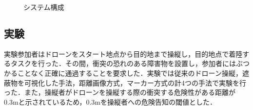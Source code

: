 \documentclass[a4j,10pt,twocolumn]{jarticle}
\begin{document}
\begin{figure}[tb]
\begin{center}
  \vspace{-2mm}
  \caption{システム構成}
  \label{fig:principle}
\end{center}
\end{figure}

\subsection{実験}
実験参加者はドローンをスタート地点から目的地まで操縦し，目的地点で着陸するタスクを行った．その間，衝突の恐れのある障害物を設置し，参加者にはぶつかることなく正確に通過することを要求した．実験では従来のドローン操縦，遮蔽物を可視化した手法，距離画像方式，マーカー方式の計4つの手法で実験を行った．また，操縦者がドローンを操縦する際の衝突する危険性がある距離が0.3mと示されている\cite{obstruct}ため，0.3mを操縦者への危険告知の閾値とした．
\end{document}
